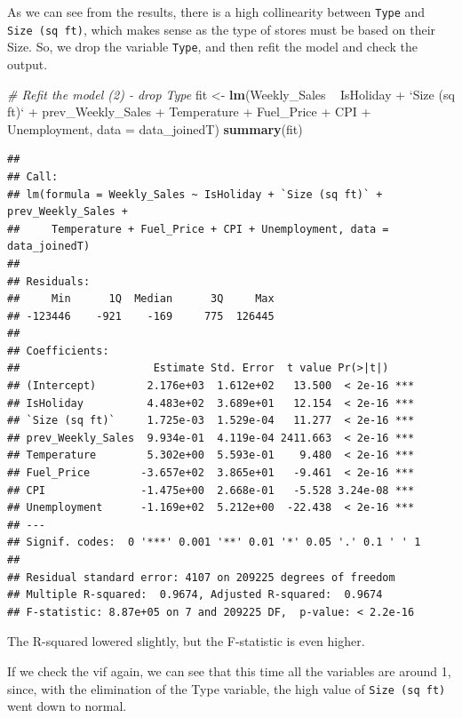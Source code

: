 \documentclass[11pt,]{article}
\newenvironment{Shaded}{\begin{snugshade}}{\end{snugshade}}
\newcommand{\KeywordTok}[1]{\textcolor[rgb]{0.13,0.29,0.53}{\textbf{{#1}}}}
\newcommand{\DataTypeTok}[1]{\textcolor[rgb]{0.13,0.29,0.53}{{#1}}}
\newcommand{\StringTok}[1]{\textcolor[rgb]{0.31,0.60,0.02}{{#1}}}
\newcommand{\CommentTok}[1]{\textcolor[rgb]{0.56,0.35,0.01}{\textit{{#1}}}}
\newcommand{\NormalTok}[1]{{#1}}
\begin{document}
As we can see from the results, there is a high collinearity between
\texttt{Type} and \texttt{Size\ (sq\ ft)}, which makes sense as the type
of stores must be based on their Size. So, we drop the variable
\texttt{Type}, and then refit the model and check the output.

\pagebreak

\begin{Shaded}
\begin{Highlighting}[]
\CommentTok{# Refit the model (2) - drop Type}
\NormalTok{fit <-}\StringTok{ }\KeywordTok{lm}\NormalTok{(Weekly_Sales ~}\StringTok{ }\NormalTok{IsHoliday +}\StringTok{ `}\DataTypeTok{Size (sq ft)}\StringTok{`} \NormalTok{+}\StringTok{ }\NormalTok{prev_Weekly_Sales +}\StringTok{ }
\StringTok{    }\NormalTok{Temperature +}\StringTok{ }\NormalTok{Fuel_Price +}\StringTok{ }\NormalTok{CPI +}\StringTok{ }\NormalTok{Unemployment, }\DataTypeTok{data =} \NormalTok{data_joinedT)}
\KeywordTok{summary}\NormalTok{(fit)}
\end{Highlighting}
\end{Shaded}

\begin{verbatim}
## 
## Call:
## lm(formula = Weekly_Sales ~ IsHoliday + `Size (sq ft)` + prev_Weekly_Sales + 
##     Temperature + Fuel_Price + CPI + Unemployment, data = data_joinedT)
## 
## Residuals:
##     Min      1Q  Median      3Q     Max 
## -123446    -921    -169     775  126445 
## 
## Coefficients:
##                     Estimate Std. Error  t value Pr(>|t|)    
## (Intercept)        2.176e+03  1.612e+02   13.500  < 2e-16 ***
## IsHoliday          4.483e+02  3.689e+01   12.154  < 2e-16 ***
## `Size (sq ft)`     1.725e-03  1.529e-04   11.277  < 2e-16 ***
## prev_Weekly_Sales  9.934e-01  4.119e-04 2411.663  < 2e-16 ***
## Temperature        5.302e+00  5.593e-01    9.480  < 2e-16 ***
## Fuel_Price        -3.657e+02  3.865e+01   -9.461  < 2e-16 ***
## CPI               -1.475e+00  2.668e-01   -5.528 3.24e-08 ***
## Unemployment      -1.169e+02  5.212e+00  -22.438  < 2e-16 ***
## ---
## Signif. codes:  0 '***' 0.001 '**' 0.01 '*' 0.05 '.' 0.1 ' ' 1
## 
## Residual standard error: 4107 on 209225 degrees of freedom
## Multiple R-squared:  0.9674, Adjusted R-squared:  0.9674 
## F-statistic: 8.87e+05 on 7 and 209225 DF,  p-value: < 2.2e-16
\end{verbatim}

The R-squared lowered slightly, but the F-statistic is even higher.

If we check the vif again, we can see that this time all the variables
are around 1, since, with the elimination of the Type variable, the high
value of \texttt{Size\ (sq\ ft)} went down to normal.
\end{document}
